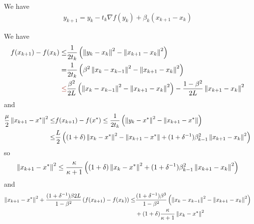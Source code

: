 \documentclass[english,12pt,a4paper]{article}
\begin{document}
We have
\begin{align*}
y_{k+1} =  y_k -t_k \nabla f(y_k) + \beta_k(x_{k+1}-x_k)
\end{align*}
%


We have
%
\begin{align*}
f(x_{k+1})- f(x_k) \le &  \frac{1}{2t_k}\left( \norm{y_k-x_k}^2 - \norm{x_{k+1}-x_k}^2\right)\\
=& \frac{1}{2t_k}\left( \beta^2\norm{x_k-x_{k-1}}^2 - \norm{x_{k+1}-x_k}^2 \right)\\
\red{\le}& \frac{\beta^2}{2L}\left( \norm{x_k-x_{k-1}}^2 - \norm{x_{k+1}-x_k}^2 \right)
-\frac{1-\beta^2}{2L} \norm{x_{k+1}-x_k}^2
\end{align*}
%
and
%
\begin{align*}
\frac{\mu}{2} \left\|x_{k+1}- x^*\right\|^2 \le& f(x_{k+1})- f(x^*) \le  \frac{1}{2t_k}\left( \left\|y_k-x^*\right\|^2 - \left\|x_{k+1}-x^*\right\|  \right)\\
\le &  \frac{L}{2}\left( (1+\delta)\left\|x_k-x^*\right\|^2 - \left\|x_{k+1}-x^*\right\| +(1+\delta^{-1})\beta_{k-1}^2\left\|x_{k+1}-x_k\right\|^2\right)
\end{align*}
%
so
%
\begin{align*}
\left\|x_{k+1}- x^*\right\|^2 \le \frac{\kappa}{\kappa+1} \left( (1+\delta)\left\|x_k-x^*\right\|^2 +(1+\delta^{-1})\beta_{k-1}^2\left\|x_{k+1}-x_k\right\|^2\right)
\end{align*}
%
and
%
\begin{align*}
\left\|x_{k+1}- x^*\right\|^2 + \frac{(1+\delta^{-1})\beta2L}{1-\beta^2} \left(f(x_{k+1})- f(x_k)\right)\le& 
\frac{(1+\delta^{-1})\beta^3}{1-\beta^2}\left( \left\|x_k-x_{k-1}\right\|^2 - \left\|x_{k+1}-x_k\right\|^2 \right)\\
&+ (1+\delta)\frac{\kappa}{\kappa+1}\left\|x_k-x^*\right\|^2
\end{align*}
%



%
\end{document}
